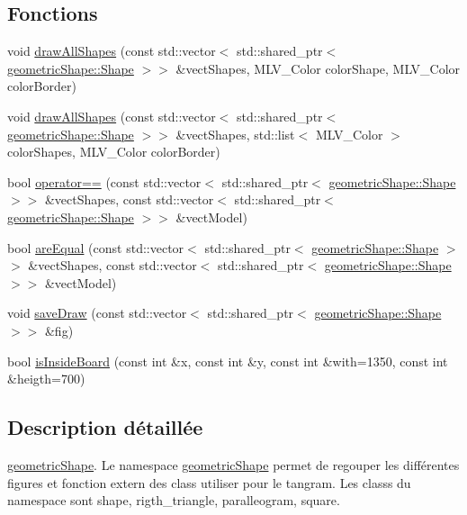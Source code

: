 \subsection*{Fonctions}
\begin{DoxyCompactItemize}
\item 
void \hyperlink{namespacegeometric_shape_a3f737265078bd7963e0398d2035f0efc}{draw\+All\+Shapes} (const std\+::vector$<$ std\+::shared\+\_\+ptr$<$ \hyperlink{classgeometric_shape_1_1_shape}{geometric\+Shape\+::\+Shape} $>$$>$ \&vect\+Shapes, M\+L\+V\+\_\+\+Color color\+Shape, M\+L\+V\+\_\+\+Color color\+Border)
\item 
void \hyperlink{namespacegeometric_shape_a5f9377ec0eea0bd91baccaf8ad242278}{draw\+All\+Shapes} (const std\+::vector$<$ std\+::shared\+\_\+ptr$<$ \hyperlink{classgeometric_shape_1_1_shape}{geometric\+Shape\+::\+Shape} $>$$>$ \&vect\+Shapes, std\+::list$<$ M\+L\+V\+\_\+\+Color $>$ color\+Shapes, M\+L\+V\+\_\+\+Color color\+Border)
\item 
bool \hyperlink{namespacegeometric_shape_a28f5ddcd750c6f9ae4be6f3efe4b7b58}{operator==} (const std\+::vector$<$ std\+::shared\+\_\+ptr$<$ \hyperlink{classgeometric_shape_1_1_shape}{geometric\+Shape\+::\+Shape} $>$$>$ \&vect\+Shapes, const std\+::vector$<$ std\+::shared\+\_\+ptr$<$ \hyperlink{classgeometric_shape_1_1_shape}{geometric\+Shape\+::\+Shape} $>$$>$ \&vect\+Model)
\item 
bool \hyperlink{namespacegeometric_shape_ac696d1fa878ce8e5aac23407fe3483f0}{are\+Equal} (const std\+::vector$<$ std\+::shared\+\_\+ptr$<$ \hyperlink{classgeometric_shape_1_1_shape}{geometric\+Shape\+::\+Shape} $>$$>$ \&vect\+Shapes, const std\+::vector$<$ std\+::shared\+\_\+ptr$<$ \hyperlink{classgeometric_shape_1_1_shape}{geometric\+Shape\+::\+Shape} $>$$>$ \&vect\+Model)
\item 
void \hyperlink{namespacegeometric_shape_ac15da5db3762601606a8f804884976d1}{save\+Draw} (const std\+::vector$<$ std\+::shared\+\_\+ptr$<$ \hyperlink{classgeometric_shape_1_1_shape}{geometric\+Shape\+::\+Shape} $>$$>$ \&fig)
\item 
bool \hyperlink{namespacegeometric_shape_a0f59a850c66128b24952caab8ca7abe2}{is\+Inside\+Board} (const int \&x, const int \&y, const int \&with=1350, const int \&heigth=700)
\end{DoxyCompactItemize}


\subsection{Description détaillée}
\hyperlink{namespacegeometric_shape}{geometric\+Shape}. Le namespace \hyperlink{namespacegeometric_shape}{geometric\+Shape} permet de regouper les différentes figures et fonction extern des class utiliser pour le tangram. Les classs du namespace sont shape, rigth\+\_\+triangle, paralleogram, square. 

